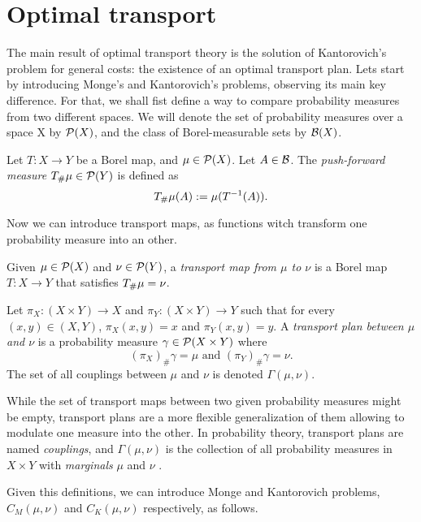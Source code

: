 \section{Optimal transport}
The main result of optimal transport theory is the solution of Kantorovich's problem for general costs: the existence of an optimal transport plan. Lets start by introducing Monge's and Kantorovich's problems, observing its main key difference. For that, we shall fist define a way to compare probability measures from two different spaces. We will denote the set of probability measures over a space X by $ \mathcal P(X) $, and the class of Borel-measurable sets by $ \mathcal B(X) $.

\begin{definition}
    Let $ T: X \to Y $ be a Borel map, and $ \mu \in \mathcal P(X)$. Let $ A \in \mathcal B $. The {\it push-forward measure} $ T_\#\mu \in \mathcal P(Y) $ is defined as
    $$
        T_\#\mu(A) := \mu (T^{-1}(A)).
    $$
\end{definition}

Now we can introduce transport maps, as functions witch transform one probability measure into an other.

\begin{definition}
    Given $ \mu \in \mathcal P(X) $ and $ \nu \in \mathcal P(Y) $, a {\it transport map from $\mu$ to $\nu$} is a Borel map $ T: X \to Y $ that satisfies $ T_\#\mu = \nu$.
\end{definition}


\begin{definition}
    Let $\pi_X : (X \times Y) \to X $ and $\pi_Y : (X \times Y) \to Y$ such that for every $(x, y) \in (X, Y) $, $\pi_X(x, y) = x$ and $ \pi_Y(x, y) = y $. A {\it transport plan between $\mu$ and $\nu$} is a probability measure $ \gamma \in \mathcal P(X \times Y) $ where
    $$
        (\pi_X)_\# \gamma = \mu \text{ and } (\pi_Y)_\# \gamma = \nu.
    $$
    The set of all couplings between $ \mu $ and $\nu$ is denoted $\Gamma(\mu, \nu)$.
\end{definition}

While the set of transport maps between two given probability measures might be empty, transport plans are a more flexible generalization of them allowing to modulate one measure into the other. In probability theory, transport plans are named {\it couplings}, and $\Gamma(\mu, \nu)$ is the collection of all probability measures in $ X \times Y $ with {\it marginals} $ \mu $ and $ \nu $ \cite{class}.

Given this definitions, we can introduce Monge and Kantorovich problems, $ C_M(\mu, \nu) $ and $ C_K(\mu, \nu) $ respectively, as follows.


